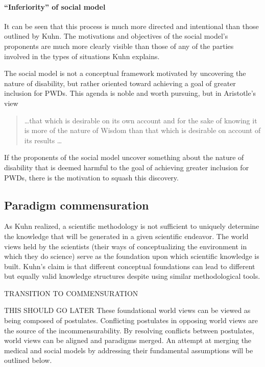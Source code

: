 \documentclass[a4paper]{article}
\begin{document}
\paragraph{``Inferiority'' of social model}
It can be seen that this process is much more directed and intentional than
those outlined by Kuhn. The motivations and objectives of the social model's
proponents are much more clearly visible than those of any of the parties
involved in the types of situations Kuhn explains.

The social model is not a conceptual framework motivated by uncovering the
nature of disability, but rather oriented toward achieving a goal of greater
inclusion for PWDs. This agenda is noble and worth pursuing, but in
Aristotle's view
%
\begin{quote}
    \ldots that which is desirable on its own account and for the sake of knowing it is
    more of the nature of Wisdom than that which is desirable on account of its
    results \ldots
\end{quote}
%
If the proponents of the social model uncover something about the nature of
disability that is deemed harmful to the goal of achieving greater
inclusion for PWDs, there is the motivation to squash this discovery.

\subsection{Paradigm commensuration}

As Kuhn realized, a scientific methodology is not sufficient to uniquely
determine the knowledge that will be generated in a given scientific endeavor.
The world views held by the scientists (their ways of conceptualizing the
environment in which they do science) serve as the foundation upon which
scientific knowledge is built. Kuhn's claim is that different conceptual
foundations can lead to different but equally valid knowledge structures
despite using similar methodological tools.

TRANSITION TO COMMENSURATION

THIS SHOULD GO LATER
These foundational world views can be viewed as being composed of postulates.
Conflicting postulates in opposing world views are the source of the
incommensurability. By resolving conflicts between postulates, world views can
be aligned and paradigms merged. An attempt at merging the medical and social
models by addressing their fundamental assumptions will be outlined below.
\end{document}

